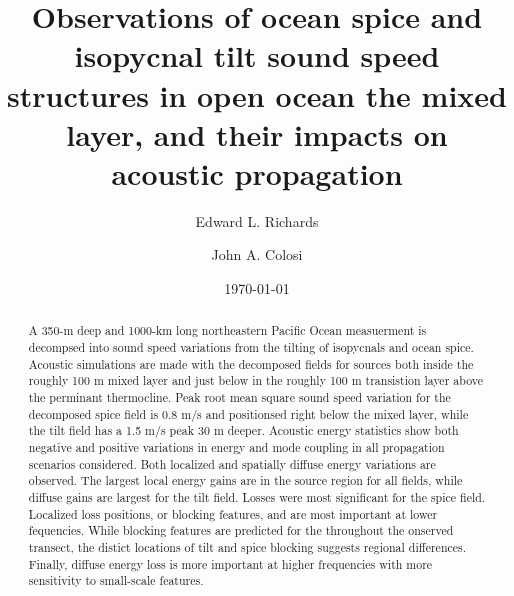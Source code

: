 \documentclass[preprint,NumberedRefs]{JASA}
\begin{document}
\title[Mixed layer tilt and spice]{Observations of ocean spice and isopycnal tilt sound speed structures in open ocean the mixed layer, and their impacts on acoustic propagation}
\author{Edward L. Richards}
\author{John A. Colosi}

\date{\today}

\begin{abstract}
A 350-m deep and 1000-km long northeastern Pacific Ocean measuerment is decompsed into sound speed variations from the tilting of isopycnals and ocean spice. Acoustic simulations are made with the decomposed fields for sources both inside the roughly 100 m mixed layer and just below in the roughly 100 m transistion layer above the perminant thermocline. Peak root mean square sound speed variation for the decomposed spice field is 0.8 m/s and positionsed right below the mixed layer, while the tilt field has a 1.5 m/s peak 30 m deeper. Acoustic energy statistics show both negative and positive variations in energy and mode coupling in all propagation scenarios considered. Both localized and spatially diffuse energy variations are observed. The largest local energy gains are in the source region for all fields, while diffuse gains are largest for the tilt field. Losses were most significant for the spice field. Localized loss positions, or blocking features, and are most important at lower fequencies. While blocking features are predicted for the throughout the onserved transect, the distict locations of tilt and spice blocking suggests regional differences. Finally, diffuse energy loss is more important at higher frequencies with more sensitivity to small-scale features.
\end{abstract}

\maketitle
\end{document}
